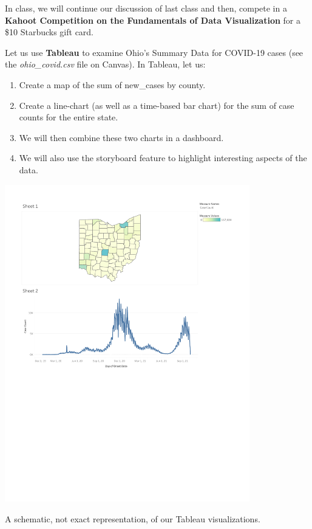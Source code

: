 \documentclass[letterpaper,addpoints, 11pt]{exam}
\begin{document}
\begin{questions}

\question[0] In class, we will continue our discussion of last class  and then, compete in a \textbf{Kahoot Competition on the Fundamentals of Data Visualization} for a \$10 Starbucks gift card. 

\vspace{0.5in}

\question[0] Let us use \textbf{Tableau} to examine Ohio's Summary Data for COVID-19 cases (see the \textit{ohio\_covid.csv} file on Canvas). In Tableau, let us:
\begin{enumerate}[label=(\Alph*)]
	\item Create a map of the sum of new\_cases by county.
	\item Create a line-chart (as well as a time-based bar chart) for the sum of case counts for the entire state.
	\item We will then combine these two charts in a dashboard.
	\item We will also use the storyboard feature to highlight interesting aspects of the data.
\end{enumerate}

\begin{center}
	\includegraphics[width=0.8\textwidth,frame, clip, trim={0.5in 4.5in 0.5in 0.5in} ]{../../figures/tableau_example.pdf} 
	
	A schematic, not exact representation, of our Tableau visualizations.
\end{center}



\end{questions}
\end{document}
